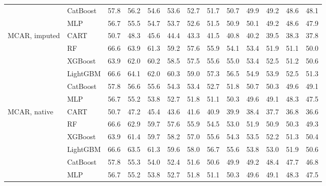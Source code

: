 \begin{table}[p]
\begin{tabular}{@{}llrrrrrrrrrrr@{}}
 & CatBoost & 57.8 & 56.2 & 54.6 & 53.6 & 52.7 & 51.7 & 50.7 & 49.9 & 49.2 & 48.6 & 48.1 \\
 & MLP & 56.7 & 55.5 & 54.7 & 53.7 & 52.6 & 51.5 & 50.9 & 50.1 & 49.2 & 48.6 & 47.9 \\
\midrule
MCAR, imputed & CART & 50.7 & 48.3 & 45.6 & 44.4 & 43.3 & 41.5 & 40.8 & 40.2 & 39.5 & 38.3 & 37.8 \\
 & RF & 66.6 & 63.9 & 61.3 & 59.2 & 57.6 & 55.9 & 54.1 & 53.4 & 51.9 & 51.1 & 50.0 \\
 & XGBoost & 63.9 & 62.0 & 60.2 & 58.5 & 57.5 & 55.6 & 55.0 & 53.4 & 52.5 & 51.2 & 50.6 \\
 & LightGBM & 66.6 & 64.1 & 62.0 & 60.3 & 59.0 & 57.3 & 56.5 & 54.9 & 53.9 & 52.5 & 51.3 \\
 & CatBoost & 57.8 & 56.6 & 55.6 & 54.3 & 53.4 & 52.7 & 51.8 & 50.7 & 50.3 & 49.6 & 49.1 \\
 & MLP & 56.7 & 55.2 & 53.8 & 52.7 & 51.8 & 51.1 & 50.3 & 49.6 & 49.1 & 48.3 & 47.5 \\
\midrule
MCAR, native & CART & 50.7 & 47.2 & 45.4 & 43.6 & 41.6 & 40.9 & 39.9 & 38.4 & 37.7 & 36.8 & 36.6 \\
 & RF & 66.6 & 62.9 & 59.7 & 57.6 & 55.9 & 54.5 & 53.0 & 51.9 & 50.9 & 50.3 & 49.3 \\
 & XGBoost & 63.9 & 61.4 & 59.7 & 58.2 & 57.0 & 55.6 & 54.3 & 53.5 & 52.2 & 51.3 & 50.4 \\
 & LightGBM & 66.6 & 63.5 & 61.3 & 59.6 & 58.0 & 56.7 & 55.6 & 53.8 & 53.0 & 51.9 & 50.6 \\
 & CatBoost & 57.8 & 55.3 & 54.0 & 52.4 & 51.6 & 50.6 & 49.9 & 49.2 & 48.4 & 47.7 & 46.8 \\
 & MLP & 56.7 & 55.2 & 53.8 & 52.7 & 51.8 & 51.1 & 50.3 & 49.6 & 49.1 & 48.3 & 47.5 \\
\bottomrule
\end{tabular}
\end{table}

